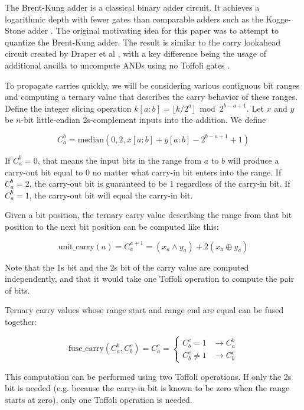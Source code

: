 \documentclass[onecolumn,unpublished]{quantumarticle}
\theoremstyle{definition}
\theoremstyle{definition}
\theoremstyle{definition}
\begin{document}
The Brent-Kung adder \cite{brent1982adder} is a classical binary adder circuit.
It achieves a logarithmic depth with fewer gates than comparable adders such as the Kogge-Stone adder \cite{kogge1973adder}.
The original motivating idea for this paper was to attempt to quantize the Brent-Kung adder.
The result is similar to the carry lookahead circuit created by Draper et al \cite{draper2004lookaheadadder}, with a key difference being the usage of additional ancilla to uncompute ANDs using no Toffoli gates \cite{gidney2018halving}.

To propagate carries quickly, we will be considering various contiguous bit ranges and computing a ternary value that describes the carry behavior of these ranges.
Define the integer slicing operation $k[a:b] = \lfloor k/2^a \rfloor \bmod 2^{b-a+1}$.
Let $x$ and $y$ be $n$-bit little-endian 2s-complement inputs into the addition.
We define

$$C_a^b = \text{median}(0, 2, x[a:b] + y[a:b] - 2^{b - a + 1} + 1)$$

If $C_a^b = 0$, that means the input bits in the range from $a$ to $b$ will produce a carry-out bit equal to 0 no matter what carry-in bit enters into the range.
If $C_a^b = 2$, the carry-out bit is guaranteed to be 1 regardless of the carry-in bit.
If $C_a^b = 1$, the carry-out bit will equal the carry-in bit.

Given a bit position, the ternary carry value describing the range from that bit position to the next bit position can be computed like this:

$$\text{unit\_carry}(a) = C_a^{a+1} = (x_a \land y_a) + 2 (x_a \oplus y_a)$$

Note that the 1s bit and the 2s bit of the carry value are computed independently, and that it would take one Toffoli operation to compute the pair of bits.

Ternary carry values whose range start and range end are equal can be fused together:

$$\text{fuse\_carry}(C_a^b, C_b^c) = C_a^c = \begin{cases}
C_b^c = 1 & \rightarrow C_a^b \\
C_b^c \neq 1 & \rightarrow C_b^c
\end{cases}$$

This computation can be performed using two Toffoli operations.
If only the 2s bit is needed (e.g. because the carry-in bit is known to be zero when the range starts at zero), only one Toffoli operation is needed.
\end{document}
